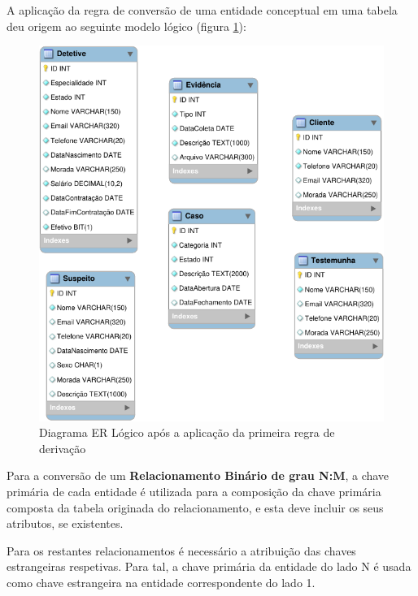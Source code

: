 \documentclass[a4paper,12pt]{scrreprt}
\begin{document}
        \vspace{0.2cm}

        A aplicação da regra de conversão de uma entidade conceptual em uma tabela deu origem ao seguinte modelo lógico (figura \ref{fig:4.1}):

        \vspace{0.1cm}

        \begin{figure}[!ht]
            \centering
            \includegraphics[scale=0.995]{images/modelo_logico/regra1.pdf}
            \caption{Diagrama ER Lógico após a aplicação da primeira regra de derivação}
            \label{fig:4.1}
        \end{figure}

        \clearpage
        
        Para a conversão de um \textbf{Relacionamento Binário de grau N:M}, a chave primária de cada entidade é utilizada para a composição da chave primária composta da tabela originada do relacionamento, e esta deve incluir os seus atributos, se existentes.

        Para os restantes relacionamentos é necessário a atribuição das chaves estrangeiras respetivas. Para tal, a chave primária da entidade do lado N é usada como chave estrangeira na entidade correspondente do lado 1.
\end{document}
